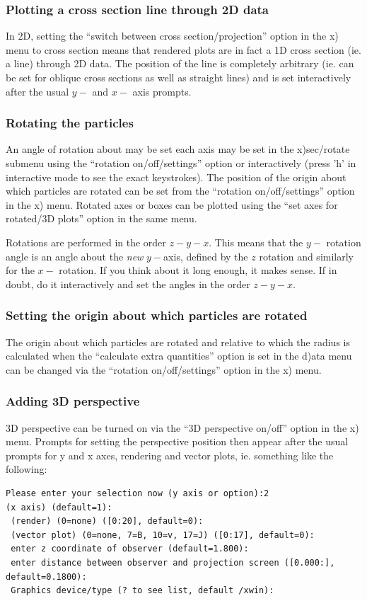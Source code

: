 \documentclass[a4paper,11pt]{article}
\begin{document}
\subsubsection{ Plotting a cross section line through 2D data}
 In 2D, setting the ``switch between cross section/projection'' option in the x) menu to cross section means that rendered plots are in fact a 1D cross section (ie. a line) through 2D data. The position of the line is completely arbitrary (ie. can be set for oblique cross sections as well as straight lines) and is set interactively after the usual $y-$ and $x-$ axis prompts.

\subsubsection{ Rotating the particles}
 An angle of rotation about may be set each axis may be set in the x)sec/rotate submenu using the ``rotation on/off/settings'' option or
interactively (press 'h' in interactive mode to see the exact keystrokes). The position of the origin about which particles are rotated can be set from the ``rotation on/off/settings'' option in the x) menu.
Rotated axes or boxes can be plotted using the ``set axes for rotated/3D plots'' option in the same menu.

Rotations are performed in the order $z-y-x$. This means that the $y-$ rotation angle is an angle about the \emph{new} $y-$axis, defined by the $z$ rotation and similarly for the $x-$ rotation. If you think about it long enough, it makes sense. If in doubt, do it interactively and set the angles in the order $z-y-x$.

\subsubsection{ Setting the origin about which particles are rotated}
 The origin about which particles are rotated and relative to which the radius is calculated when the ``calculate extra quantities'' option is set in the d)ata menu can be changed via the ``rotation on/off/settings'' option in the x) menu.

\subsubsection{ Adding 3D perspective}
\label{sec:3Dperspective}
 3D perspective can be turned on via the ``3D perspective on/off'' option in the x) menu. Prompts for setting the perspective position then appear after the usual prompts for y and x axes, rendering and vector plots, ie. something like the following:
\begin{verbatim}
Please enter your selection now (y axis or option):2
(x axis) (default=1):
 (render) (0=none) ([0:20], default=0):
 (vector plot) (0=none, 7=B, 10=v, 17=J) ([0:17], default=0):
 enter z coordinate of observer (default=1.800):
 enter distance between observer and projection screen ([0.000:], default=0.1800):
 Graphics device/type (? to see list, default /xwin): 
\end{verbatim}
 
\end{document}
